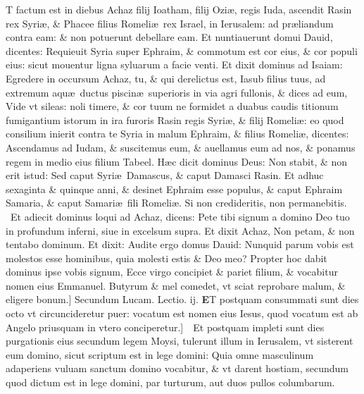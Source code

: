 \documentclass[a5paper,10pt]{book}
\def\leftmarginnote{%
	\lrmarginnote{\hskip -\marginparsep \hskip -6.5em}}
\def\rightmarginnote{%
	\lrmarginnote{\hskip\columnwidth \hskip -1em}}
\def\ae{æ}
\begin{document}
\begin{multicols*}{2}
\vspace{-.5em}
T\rightmarginnote{ca. 7.} factum est in diebus Achaz filij Ioatham, filij Ozi\ae , regis Iuda, ascendit Rasin rex Syri\ae , \& Phacee filius Romeli\ae \ rex Israel, in Ierusalem: ad pr\ae liandum contra eam: \& non potuerunt debellare eam.
Et nuntiauerunt domui Dauid, dicentes: Requieuit Syria super Ephraim, \& commotum est cor eius, \& cor populi eius: sicut mouentur ligna syluarum a facie venti.
Et dixit dominus ad Isaiam: Egredere in occursum Achaz, tu, \& qui derelictus est, Iasub filius tuus, ad extremum aqu\ae \ ductus piscin\ae \ superioris in via agri fullonis, \& dices ad eum, Vide vt sileas: noli timere, \& cor tuum ne formidet a duabus caudis titionum fumigantium istorum in ira furoris Rasin regis Syri\ae , \& filij Romeli\ae : eo quod consilium inierit contra te Syria in malum Ephraim, \& filius Romeli\ae , dicentes: Ascendamus ad Iudam, \& suscitemus eum, \& auellamus eum ad nos, \& ponamus regem in medio eius filium Tabeel.
H\ae c dicit dominus Deus: Non stabit, \& non erit istud:
Sed caput Syri\ae \ Damascus, \& caput Damasci Rasin.
Et adhuc sexaginta \& quinque anni, \& desinet Ephraim esse populus, \& caput Ephraim Samaria, \& caput Samari\ae \ fili Romeli\ae .
Si non credideritis, non permanebitis. \textdagger \ 
Et\leftmarginnote{\begin{flushright}B\end{flushright}} adiecit dominus loqui ad Achaz, dicens: Pete tibi signum a domino Deo tuo in profundum inferni, siue in excelsum supra. Et dixit Achaz, Non petam, \& non tentabo dominum.
Et dixit: Audite ergo domus Dauid: Nunquid parum vobis est molestos esse hominibus, quia molesti estis \& Deo meo?
Propter hoc dabit dominus ipse vobis signum, Ecce virgo concipiet \& pariet filium, \& vocabitur nomen eius Emmanuel.
Butyrum \& mel comedet, vt sciat reprobare malum, \& eligere bonum.]
\newline \color{red} Secundum Lucam. \hfill Lectio. ij. \color{black}
\vspace{-.5em}
\lettrine[lines=2]{\bfseries \color{red} E}{}\textdagger T\leftmarginnote{\begin{flushright}c.2.c\end{flushright}} postquam consummati sunt dies octo vt circuncideretur puer: vocatum est nomen eius Iesus, quod vocatum est ab Angelo priusquam in vtero conciperetur.]\ \textdagger \ 
Et\leftmarginnote{\begin{flushright}D\end{flushright}} postquam impleti sunt dies purgationis eius secundum legem Moysi, tulerunt illum in Ierusalem, vt sisterent eum domino, sicut scriptum est in lege domini: Quia omne masculinum adaperiens vuluam sanctum domino vocabitur, \& vt darent hostiam, secundum quod dictum est in lege domini, par turturum, aut duos pullos columbarum.

\end{multicols*}
\end{document}
